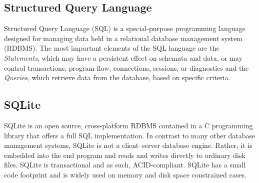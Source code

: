   \subsection{Structured Query Language}
    Structured Query Language (SQL) is a special-purpose programming language designed for managing data held in a relational database management system (RDBMS). The most important elements of the SQL language are the \emph{Statements}, which may have a persistent effect on schemata and data, or may control transactions, program flow, connections, sessions, or diagnostics and the \emph{Queries}, which retrieve data from the database, based on specific criteria.

  \subsection{SQLite}
    SQLite\cite{sqlite} is an open source, cross-platform RDBMS contained in a C programming library that offers a full SQL implementation. In contrast to many other database management systems, SQLite is not a client–server database engine. Rather, it is embedded into the end program and reads and writes directly to ordinary disk files. SQLite is transactional and as such, ACID-compliant. SQLite has a small code footprint and is widely used on memory and disk space constrained cases.
